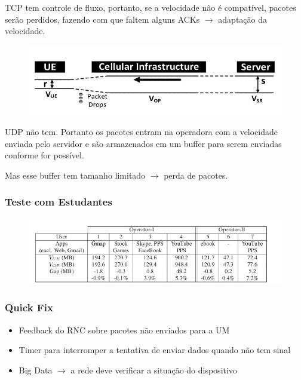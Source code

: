 \documentclass[brazil]{beamer}
\begin{document}
\begin{frame}[fragile]
    TCP tem controle de fluxo, portanto, se a velocidade não é compatível, pacotes serão perdidos, fazendo com que faltem alguns ACKs $\rightarrow$ adaptação da velocidade.
    
    \begin{figure}
    \begin{center}
        \includegraphics[scale=0.3]{images/packetLoss.jpg}
    \end{center}
    \end{figure}
\end{frame}

\begin{frame}[fragile]
    UDP não tem. Portanto os pacotes entram na operadora com a velocidade enviada pelo servidor e são armazenados em um buffer para serem enviadas conforme for possível. 


    \vspace{0.3cm}
    Mas esse buffer tem tamanho limitado $\rightarrow$ perda de pacotes.
\end{frame}

\begin{frame}[fragile]
    \frametitle{Teste com Estudantes}
    \begin{figure}
    \begin{center}
        \includegraphics[scale=0.4]{images/seteEstudantes.jpg}
    \end{center}
    \end{figure}
\end{frame}

\begin{frame}[fragile]
        \frametitle{Quick Fix}
        \begin{itemize}
            \item Feedback do RNC sobre pacotes não enviados para a UM
            \item Timer para interromper a tentativa de enviar dados quando não tem sinal
            \item Big Data $\rightarrow$ a rede deve verificar a situação do dispositivo
        \end{itemize}
\end{frame}
\end{document}

